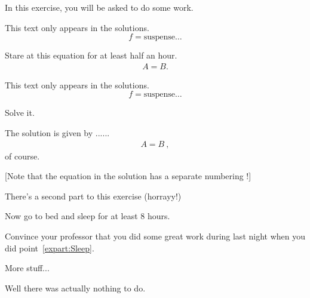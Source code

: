 \documentclass[11pt,a4paper]{article}
\begin{document}
\MakeUebungHeader


In this exercise, you will be asked to do some work.

\begin{onlymusterloesung}
  This text only appears in the solutions.
  \begin{equation}
    f = \text{suspense}\ldots
  \end{equation}
\end{onlymusterloesung}


\begin{exenumerate}
\item Stare at this equation for at least half an hour.
  \begin{align}
    A = B.
  \end{align}

  \begin{onlymusterloesung}
    This text only appears in the solutions.
    \begin{equation}
      f = \text{suspense}\ldots
    \end{equation}
  \end{onlymusterloesung}

\item Solve it.

  \begin{loesung}%
    The solution is given by ...... 
    \begin{align}
      A=B\ ,
    \end{align}
    of course.

    [Note that the equation in the solution has a separate numbering !]
  \end{loesung}
\end{exenumerate}

There's a second part to this exercise (horrayy!)

\begin{exenumerate} %
\item \label{expart:Sleep} Now go to bed and sleep for at least 8 hours.
\item Convince your professor that you did some great work during last night when you did
  point~\ref{expart:Sleep}.
\end{exenumerate}



More stuff...

\begin{solution} %
  Well there was actually nothing to do.
\end{solution}
\end{document}
